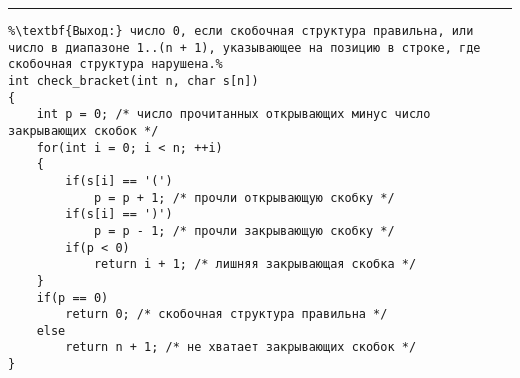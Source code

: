 \documentclass{article}
\begin{document}
\vspace{5pt} \hrule
\begin{lstlisting}[caption={Проверка правильности скобочной структуры}, label=p309, escapechar=\%]
%\noindent\textbf{Вход:} строка s: \textbf{array} [1..n] \textbf{of char}, возможно, содержащая скобки '(' и ')'.\\%
%\textbf{Выход:} число 0, если скобочная структура правильна, или число в диапазоне 1..(n + 1), указывающее на позицию в строке, где скобочная структура нарушена.%
int check_bracket(int n, char s[n])
{
	int p = 0; /* число прочитанных открывающих минус число закрывающих скобок */
	for(int i = 0; i < n; ++i)
	{
		if(s[i] == '(')
			p = p + 1; /* прочли открывающую скобку */
		if(s[i] == ')')
			p = p - 1; /* прочли закрывающую скобку */
		if(p < 0)
			return i + 1; /* лишняя закрывающая скобка */
	}
	if(p == 0)
		return 0; /* скобочная структура правильна */
	else
		return n + 1; /* не хватает закрывающих скобок */
}
\end{lstlisting}
\end{document}
